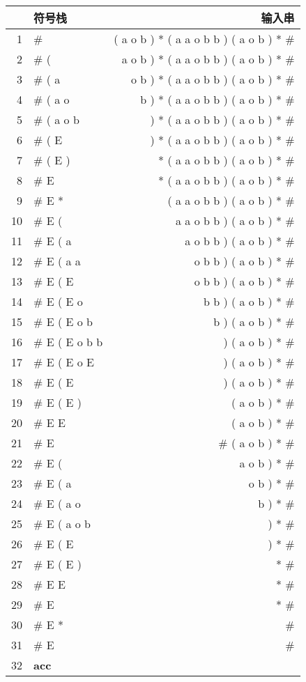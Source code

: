 \begin{center}
\begin{longtable}{r|l@{\hspace{10em}}r}
\toprule
 & \textbf{符号栈} & \textbf{输入串}\\
\hline
1 & \# & ( a o b ) * ( a a o b b ) ( a o b ) * \# \\
\hline
2 & \# ( & a o b ) * ( a a o b b ) ( a o b ) * \# \\
\hline
3 & \# ( a & o b ) * ( a a o b b ) ( a o b ) * \# \\
\hline
4 & \# ( a o & b ) * ( a a o b b ) ( a o b ) * \# \\
\hline
5 & \# ( a o b & ) * ( a a o b b ) ( a o b ) * \# \\
\hline
6 & \# ( E & ) * ( a a o b b ) ( a o b ) * \# \\
\hline
7 & \# ( E ) & * ( a a o b b ) ( a o b ) * \# \\
\hline
8 & \# E & * ( a a o b b ) ( a o b ) * \# \\
\hline
9 & \# E * & ( a a o b b ) ( a o b ) * \# \\
\hline
10 & \# E ( & a a o b b ) ( a o b ) * \# \\
\hline
11 & \# E ( a & a o b b ) ( a o b ) * \# \\
\hline
12 & \# E ( a a & o b b ) ( a o b ) * \# \\
\hline
13 & \# E ( E & o b b ) ( a o b ) * \# \\
\hline
14 & \# E ( E o & b b ) ( a o b ) * \# \\
\hline
15 & \# E ( E o b & b ) ( a o b ) * \# \\
\hline
16 & \# E ( E o b b & ) ( a o b ) * \# \\
\hline
17 & \# E ( E o E & ) ( a o b ) * \# \\
\hline
18 & \# E ( E & ) ( a o b ) * \# \\
\hline
19 & \# E ( E ) & ( a o b ) * \# \\
\hline
20 & \# E E & ( a o b ) * \# \\
\hline
21 & \# E & \# ( a o b ) * \# \\
\hline
22 & \# E ( & a o b ) * \# \\
\hline
23 & \# E ( a & o b ) * \# \\
\hline
24 & \# E ( a o & b ) * \# \\
\hline
25 & \# E ( a o b & ) * \# \\
\hline
26 & \# E ( E & ) * \# \\
\hline
27 & \# E ( E ) & * \# \\
\hline
28 & \# E E & * \# \\
\hline
29 & \# E & * \# \\
\hline
30 & \# E * & \# \\
\hline
31 & \# E & \# \\
\hline
32 & \textbf{acc} & \\
\bottomrule
\end{longtable}
\end{center}